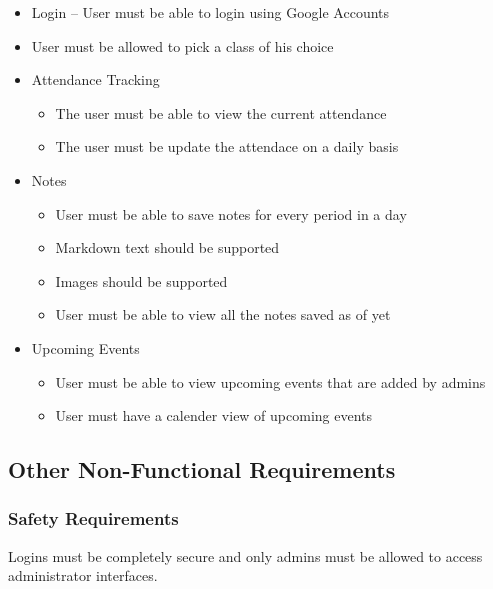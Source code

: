 \begin{itemize}

\item Login – User must be able to login using Google Accounts
\item User must be allowed to pick a class of his choice
\item Attendance Tracking

\begin{itemize}
\item The user must be able to view the current attendance
\item The user must be update the attendace on a daily basis
\end{itemize}

\item Notes

\begin{itemize}
\item User must be able to save notes for every period in a day
\item Markdown text should be supported
\item Images should be supported
\item User must be able to view all the notes saved as of yet
\end{itemize}

\item Upcoming Events

\begin{itemize}
\item User must be able to view upcoming events that are added by admins
\item User must have a calender view of upcoming events
\end{itemize}

\end{itemize}

\subsection{Other Non-Functional Requirements}

\subsubsection{Safety Requirements}
Logins must be completely secure and only admins must be allowed to access administrator interfaces.
